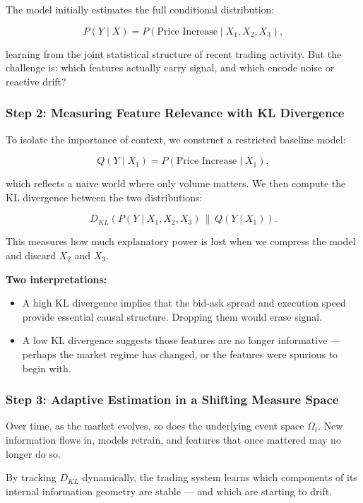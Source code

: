 The model initially estimates the full conditional distribution:

\[
P(Y \mid X) = P(\text{Price Increase} \mid X_1, X_2, X_3),
\]

learning from the joint statistical structure of recent trading activity. But the challenge is: which features actually carry signal, and which encode noise or reactive drift?

\subsubsection{Step 2: Measuring Feature Relevance with KL Divergence}

To isolate the importance of context, we construct a restricted baseline model:

\[
Q(Y \mid X_1) = P(\text{Price Increase} \mid X_1),
\]

which reflects a naive world where only volume matters. We then compute the KL divergence between the two distributions:

\[
D_{KL}(P(Y \mid X_1, X_2, X_3) \,\|\, Q(Y \mid X_1)).
\]

This measures how much explanatory power is lost when we compress the model and discard \( X_2 \) and \( X_3 \).

\textbf{Two interpretations:}
\begin{itemize}
    \item A high KL divergence implies that the bid-ask spread and execution speed provide essential causal structure. Dropping them would erase signal.
    \item A low KL divergence suggests those features are no longer informative — perhaps the market regime has changed, or the features were spurious to begin with.
\end{itemize}

\subsubsection{Step 3: Adaptive Estimation in a Shifting Measure Space}

Over time, as the market evolves, so does the underlying event space \( \Omega_t \). New information flows in, models retrain, and features that once mattered may no longer do so.

By tracking \( D_{KL} \) dynamically, the trading system learns which components of its internal information geometry are stable — and which are starting to drift.

